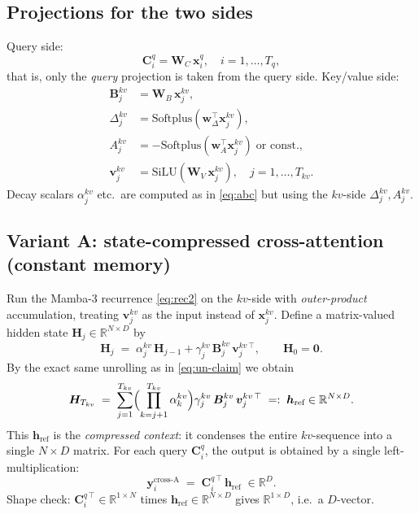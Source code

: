 \documentclass[11pt,a4paper]{article}
\begin{document}
\subsection{Projections for the two sides}

Query side:
\begin{equation}\label{eq:cross-proj-q}
  \bm{C}_i^{q} = \bm{W}_C\,\bm{x}_i^{q},
  \quad i=1,\dots,T_q,
\end{equation}
that is, only the \emph{query} projection is taken from the query
side. Key/value side:
\begin{align}
  \bm{B}_j^{kv} &= \bm{W}_B\,\bm{x}_j^{kv}, \\
  \Delta_j^{kv} &= \mathrm{Softplus}(\bm{w}_\Delta^\top \bm{x}_j^{kv}), \\
  A_j^{kv}      &= -\mathrm{Softplus}(\bm{w}_A^\top \bm{x}_j^{kv})\;\text{or const.}, \\
  \bm{v}_j^{kv} &= \mathrm{SiLU}(\bm{W}_V\,\bm{x}_j^{kv}),
  \quad j=1,\dots,T_{kv}.
\end{align}
Decay scalars $\alpha_j^{kv}$ etc.\ are computed as in \eqref{eq:abc}
but using the $kv$-side $\Delta_j^{kv}, A_j^{kv}$.

\subsection{Variant A: state-compressed cross-attention (constant memory)}
\label{sec:crossA}

Run the Mamba-3 recurrence \eqref{eq:rec2} on the $kv$-side with
\emph{outer-product} accumulation, treating $\bm{v}_j^{kv}$ as the
input instead of $\bm{x}_j^{kv}$. Define a matrix-valued hidden state
$\bm{H}_j \in \mathbb{R}^{N\times D}$ by
\begin{equation}\label{eq:Hrec}
  \bm{H}_j \;=\; \alpha_j^{kv}\,\bm{H}_{j-1}
                + \gamma_j^{kv}\,\bm{B}_j^{kv}\,\bm{v}_j^{kv\,\top},
  \qquad \bm{H}_0 = \bm{0}.
\end{equation}
By the exact same unrolling as in \eqref{eq:un-claim} we obtain
\begin{equation}\label{eq:Hclose}
  \bm{H}_{T_{kv}} \;=\; \sum_{j=1}^{T_{kv}}
      \Bigl(\prod_{k=j+1}^{T_{kv}}\alpha_k^{kv}\Bigr)
      \gamma_j^{kv}\,\bm{B}_j^{kv}\,\bm{v}_j^{kv\,\top}
  \;=:\; \bm{h}_{\text{ref}} \in \mathbb{R}^{N\times D}.
\end{equation}
This $\bm{h}_{\text{ref}}$ is the \emph{compressed context}: it
condenses the entire $kv$-sequence into a single $N\times D$ matrix.
For each query $\bm{C}_i^q$, the output is obtained by a single
left-multiplication:
\begin{equation}\label{eq:crossA-out}
  \boxed{\;\bm{y}_i^{\text{cross-A}} \;=\; \bm{C}_i^{q\,\top}\,\bm{h}_{\text{ref}} \;\in \mathbb{R}^{D}.\;}
\end{equation}
Shape check: $\bm{C}_i^{q\,\top}\in\mathbb{R}^{1\times N}$ times
$\bm{h}_{\text{ref}}\in\mathbb{R}^{N\times D}$ gives
$\mathbb{R}^{1\times D}$, i.e.\ a $D$-vector.
\end{document}
